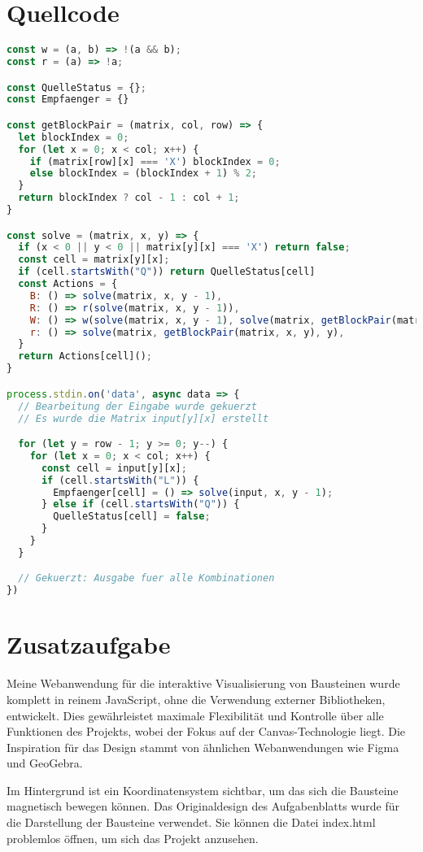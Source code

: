 \documentclass[a4paper,10pt,ngerman]{scrartcl}
\begin{document}
\section{Quellcode}
\begin{lstlisting}[language=JavaScript]
const w = (a, b) => !(a && b);
const r = (a) => !a;

const QuelleStatus = {};
const Empfaenger = {}

const getBlockPair = (matrix, col, row) => {
  let blockIndex = 0;
  for (let x = 0; x < col; x++) {
    if (matrix[row][x] === 'X') blockIndex = 0;
    else blockIndex = (blockIndex + 1) % 2;
  }
  return blockIndex ? col - 1 : col + 1;
}

const solve = (matrix, x, y) => {
  if (x < 0 || y < 0 || matrix[y][x] === 'X') return false;
  const cell = matrix[y][x];
  if (cell.startsWith("Q")) return QuelleStatus[cell]
  const Actions = {
    B: () => solve(matrix, x, y - 1),
    R: () => r(solve(matrix, x, y - 1)),
    W: () => w(solve(matrix, x, y - 1), solve(matrix, getBlockPair(matrix, x, y), y - 1)),
    r: () => solve(matrix, getBlockPair(matrix, x, y), y),
  }
  return Actions[cell]();
}

process.stdin.on('data', async data => {
  // Bearbeitung der Eingabe wurde gekuerzt
  // Es wurde die Matrix input[y][x] erstellt

  for (let y = row - 1; y >= 0; y--) {
    for (let x = 0; x < col; x++) {
      const cell = input[y][x];
      if (cell.startsWith("L")) {
        Empfaenger[cell] = () => solve(input, x, y - 1);
      } else if (cell.startsWith("Q")) {
        QuelleStatus[cell] = false;
      }
    }
  }

  // Gekuerzt: Ausgabe fuer alle Kombinationen
})

\end{lstlisting}

\section{Zusatzaufgabe}

Meine Webanwendung für die interaktive Visualisierung von Bausteinen wurde komplett in reinem JavaScript, ohne die Verwendung externer Bibliotheken, entwickelt. Dies gewährleistet maximale Flexibilität und Kontrolle über alle Funktionen des Projekts, wobei der Fokus auf der Canvas-Technologie liegt. Die Inspiration für das Design stammt von ähnlichen Webanwendungen wie Figma und GeoGebra.

Im Hintergrund ist ein Koordinatensystem sichtbar, um das sich die Bausteine magnetisch bewegen können. Das Originaldesign des Aufgabenblatts wurde für die Darstellung der Bausteine verwendet.
Sie können die Datei index.html problemlos öffnen, um sich das Projekt anzusehen.
\end{document}
